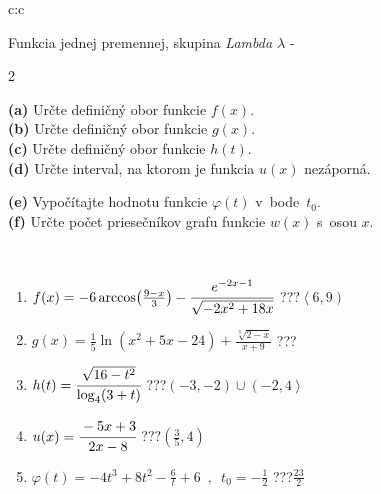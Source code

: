 \documentclass[10pt]{report}
\begin{document}
\begin{tabular}{c:c}
\begin{minipage}[c][104.5mm][t]{0.5\linewidth}
\begin{center}
\vspace{7mm}
{\huge Funkcia jednej premennej, skupina \textit{Lambda $\lambda$} -}\\[5mm]
\begin{minipage}{0.95\linewidth}
\begin{center}
{\small \begin{multicols}{2} \raggedright
\textbf{(a)} Určte definičný obor funkcie \(f(x)\). \\[1mm]
\textbf{(b)} Určte definičný obor funkcie \(g(x)\). \\[1mm]
\textbf{(c)} Určte definičný obor funkcie \(h(t)\). \\[1mm]
\textbf{(d)} Určte interval, na ktorom je funkcia \(u(x)\) nezáporná. \par \columnbreak
\textbf{(e)} Vypočítajte hodnotu funkcie \(\varphi(t)\) v~bode~\(t_0\). \\[1mm]
\textbf{(f)} Určte počet priesečníkov grafu funkcie \(w(x)\) s~osou \(x\). \\[1mm]
\end{multicols}
}
\end{center}
\end{minipage}
\\[4mm]
\begin{minipage}{0.79\linewidth}
\begin{center}
\begin{varwidth}{\linewidth}
\begin{enumerate}
\small
\item $f(x) = -6\arccos\!\left( \frac{9-x}{3} \right) - \cfrac{e^{-2x-1}}{\sqrt{-2x^2+18x}}$\quad \dotfill\; ???\;\dotfill \quad $\left\langle6 , 9\right)$
\item $g(x) = \frac{1}{5} \ln{\!(x^2+5x-24)}+\frac{\sqrt[3]{2-x}}{x+9}$\quad \dotfill\; ???\;\dotfill {}
\item $h(t) = \cfrac{\sqrt{16-t^2}}{\log_4(3+t)}$\quad \dotfill\; ???\;\dotfill \quad $\left(-3 , -2\right)\cup\left(-2 , 4\right\rangle$
\item $u(x) = \cfrac{-5x+3}{2x-8}$\quad \dotfill\; ???\;\dotfill \quad $\left(\frac{3}{5} , 4\right)$
\item $\varphi(t) = -4t^3+8t^2-\frac{6}{t}+6 \enspace , \enspace t_0=-\frac{1}{2}$\quad \dotfill\; ???\;\dotfill \quad $\frac{23}{2}$

\end{enumerate}
\end{varwidth}
\end{center}
\end{minipage}
\end{center}
\end{minipage}
\end{tabular}
\end{document}
